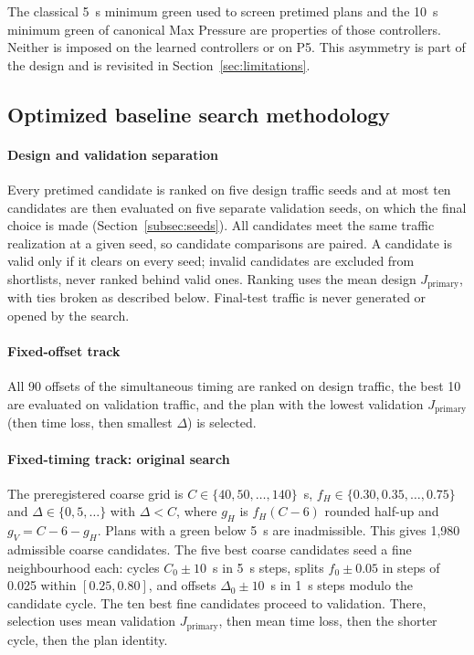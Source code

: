 \documentclass[review,12pt]{elsarticle}
\newcommand{\Jp}{J_{\mathrm{primary}}}
\begin{document}
The classical 5~s minimum green used to screen pretimed plans and the
10~s minimum green of canonical Max Pressure are properties of those
controllers. Neither is imposed on the learned controllers or on P5.
This asymmetry is part of the design and is revisited in
Section~\ref{sec:limitations}.

\subsection{Optimized baseline search methodology}
\label{subsec:baseline_search}

\paragraph{Design and validation separation} Every pretimed candidate is
ranked on five design traffic seeds and at most ten candidates are then
evaluated on five separate validation seeds, on which the final choice
is made (Section~\ref{subsec:seeds}). All candidates meet the same
traffic realization at a given seed, so candidate comparisons are
paired. A candidate is valid only if it clears on every seed; invalid
candidates are excluded from shortlists, never ranked behind valid
ones. Ranking uses the mean design $\Jp$, with ties broken as described
below. Final-test traffic is never generated or opened by the search.

\paragraph{Fixed-offset track} All 90 offsets of the simultaneous timing
are ranked on design traffic, the best 10 are evaluated on validation
traffic, and the plan with the lowest validation $\Jp$ (then time loss,
then smallest $\Delta$) is selected.

\paragraph{Fixed-timing track: original search} The preregistered coarse
grid is $C\in\{40,50,\dots,140\}$~s,
$f_H\in\{0.30,0.35,\dots,0.75\}$ and $\Delta\in\{0,5,\dots\}$ with
$\Delta<C$, where $g_H$ is $f_H(C-6)$ rounded half-up and $g_V=C-6-g_H$.
Plans with a green below 5~s are inadmissible. This gives 1{,}980
admissible coarse candidates. The five best coarse candidates seed a
fine neighbourhood each: cycles $C_0\pm10$~s in 5~s steps, splits
$f_0\pm0.05$ in steps of 0.025 within $[0.25,0.80]$, and offsets
$\Delta_0\pm10$~s in 1~s steps modulo the candidate cycle. The ten best
fine candidates proceed to validation. There, selection uses mean
validation $\Jp$, then mean time loss, then the shorter cycle, then the
plan identity.
\end{document}
